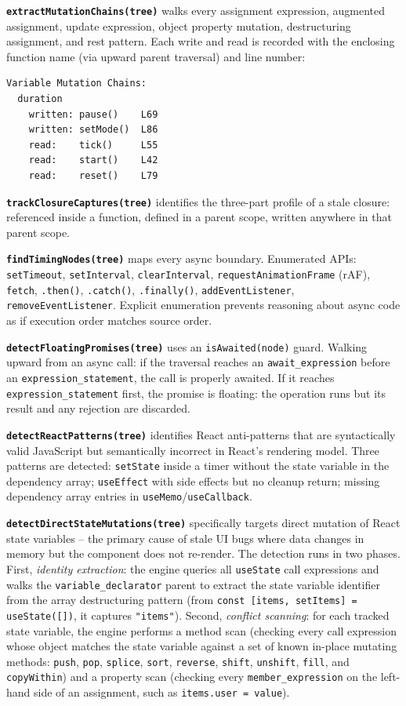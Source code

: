 \documentclass[12pt,a4paper]{article}
\newcommand{\code}[1]{\texttt{\small #1}}
\begin{document}
\textbf{\code{extractMutationChains(tree)}} walks every assignment expression, augmented
assignment, update expression, object property mutation, destructuring assignment, and rest
pattern. Each write and read is recorded with the enclosing function name (via upward parent
traversal) and line number:

\begin{lstlisting}[language={},style=code]
Variable Mutation Chains:
  duration
    written: pause()    L69
    written: setMode()  L86
    read:    tick()     L55
    read:    start()    L42
    read:    reset()    L79
\end{lstlisting}

\textbf{\code{trackClosureCaptures(tree)}} identifies the three-part profile of a stale
closure: referenced inside a function, defined in a parent scope, written anywhere in
that parent scope.

\textbf{\code{findTimingNodes(tree)}} maps every async boundary. Enumerated
APIs: \code{setTimeout}, \code{setInterval}, \code{clearInterval},
\code{requestAnimationFrame} (rAF), \code{fetch}, \code{.then()},
\code{.catch()}, \code{.finally()}, \code{addEventListener},
\code{removeEventListener}. Explicit enumeration prevents reasoning
about async code as if execution order matches source order.

\textbf{\code{detectFloatingPromises(tree)}} uses an \code{isAwaited(node)} guard.
Walking upward from an async call: if the traversal reaches an \code{await\_expression}
before an \code{expression\_statement}, the call is properly awaited. If it reaches
\code{expression\_statement} first, the promise is floating: the operation runs but its
result and any rejection are discarded.

\textbf{\code{detectReactPatterns(tree)}} identifies React anti-patterns that are
syntactically valid JavaScript but semantically incorrect in React's rendering model.
Three patterns are detected: \code{setState} inside a timer without the state variable
in the dependency array; \code{useEffect} with side effects but no cleanup return; missing
dependency array entries in \code{useMemo}/\code{useCallback}.

\textbf{\code{detectDirectStateMutations(tree)}} specifically targets direct mutation of
React state variables -- the primary cause of stale UI bugs where data changes in memory
but the component does not re-render. The detection runs in two phases. First,
\textit{identity extraction}: the engine queries all \code{useState} call expressions and
walks the \code{variable\_declarator} parent to extract the state variable identifier from
the array destructuring pattern (from \code{const [items, setItems] = useState([])},
it captures \code{"items"}). Second, \textit{conflict scanning}: for each tracked state
variable, the engine performs a method scan (checking every call expression whose object
matches the state variable against a set of known in-place mutating methods: \code{push},
\code{pop}, \code{splice}, \code{sort}, \code{reverse}, \code{shift}, \code{unshift},
\code{fill}, and \code{copyWithin}) and a property scan (checking every
\code{member\_expression} on the left-hand side of an assignment, such as
\code{items.user = value}).
\end{document}
